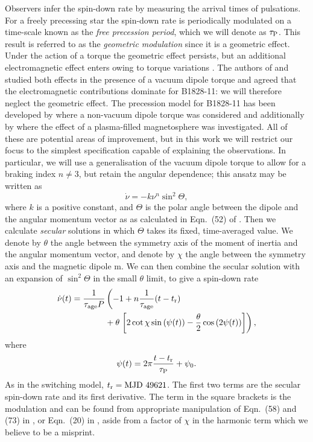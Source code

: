 \documentclass[../full_thesis/full_thesis.tex]{subfiles}
\newcommand{\tauAge}{\tau_{\textrm{age}}}
\begin{document}
Observers infer the spin-down rate by measuring the arrival times of
pulsations.
For a freely precessing star the spin-down rate is periodically modulated on a
time-scale known as the \emph{free precession period}, which we will denote as
$\tau_{\mathrm{P}}$.  This result is referred to as the \emph{geometric modulation}
\citep{Jones2001} since it is a geometric effect.  Under the action of a torque
the geometric effect persists, but an additional electromagnetic effect enters
owing to torque variations \citep{Cordes1993}. The authors of
\citet{Jones2001} and \citet{Link2001} studied both effects in the
presence of a vacuum dipole torque \citep{Davis1970} and agreed that the
electromagnetic contributions dominate for B1828-11: we will therefore neglect
the geometric effect. The precession model for
B1828-11 has been developed by \citet{Akgun2006} where a non-vacuum
dipole torque was considered and additionally by \citet{Arzamasskiy2015}
where the effect of a plasma-filled magnetosphere was investigated. All of these are
potential areas of improvement, but in this work we will restrict our focus
to the simplest
specification capable of explaining the observations.  In particular, we will
use a generalisation of the vacuum dipole torque to allow for a braking index
$n\ne3$, but retain the angular dependence; this ansatz may be written as
\begin{equation}
\dot{\nu} = -k\nu^{n}\sin^{2}\Theta,
\end{equation}
where $k$ is a positive constant, and $\Theta$ is the
polar angle between the dipole and the angular momentum vector as
as calculated in Eqn.~(52) of \citet{Jones2001}.
Then we calculate \emph{secular} solutions in which $\Theta$ takes its fixed, time-averaged
value. We denote by $\theta$  the angle between the symmetry axis of the
moment of inertia and the angular momentum vector, and denote by $\chi$ the
angle between the symmetry axis and the magnetic dipole m.  We can then combine
the secular solution with an expansion of $\sin^2 \Theta$ in the small
$\theta$ limit, to give a spin-down rate
\begin{align}
\begin{split}
\dot{\nu}(t) = \frac{1}{\tauAge P}&\left(-1 + n\frac{1}{\tauAge} (t-\tref)
                \right. \\
& + \theta \left.\left[
2\cot\chi\sin\left(\psi(t)\right) - \frac{\theta}{2}\cos\left(2\psi(t)\right)
\right]\right),
\end{split}
\label{eqn: precession nudot degen}
\end{align}
where
\begin{equation}
\psi(t)= 2\pi\frac{t-t_{\textrm{r}}}{\tau_{\mathrm{P}}} + \psi_{0}.
\end{equation}
As in the switching model, $t_{\textrm{r}}= \textrm{MJD } 49621$.
The first two terms are the secular spin-down rate and its first derivative.
The term in the square brackets is the modulation and can be found from appropriate
manipulation of Eqn.~(58) and (73) in \citet{Jones2001}, or Eqn.~(20) in
\citet{Link2001}, aside from a factor of $\chi$ in the harmonic term which we
believe to be a misprint.
\end{document}
